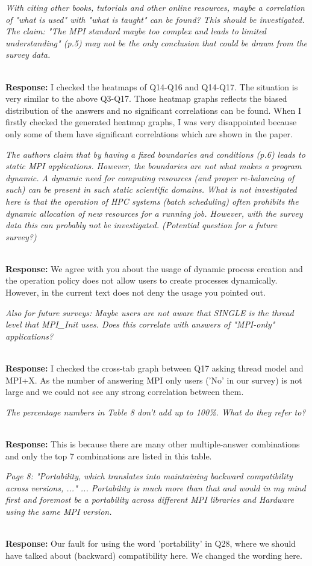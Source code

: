 \documentclass[11pt]{article}
\newcommand{\iresponse}[2]{{\item \em #1}\\%
  {\bf Response:} #2}
\begin{document}
\begin{enumerate}
\iresponse{With citing other books, tutorials and other online
  resources, maybe a correlation of "what is used" with "what is
  taught" can be found? This should be investigated. The claim: "The
  MPI standard maybe too complex and leads to limited understanding"
  (p.5) may not be the only conclusion that could be drawn from the
  survey data.}
{I checked the heatmaps of Q14-Q16 and Q14-Q17. The situation is very
  similar to the above Q3-Q17. Those heatmap graphs reflects the
  biased distribution of the answers and no significant correlations
  can be found. When I firstly checked the generated heatmap graphs, I
  was very disappointed because only some of them have significant
  correlations which are shown in the paper.}

\iresponse{The authors claim that by having a fixed boundaries and
  conditions (p.6) leads to static MPI applications. However, the
  boundaries are not what makes a program dynamic. A dynamic need for
  computing resources (and proper re-balancing of such) can be present
  in such static scientific domains. What is not investigated here is
  that the operation of HPC systems (batch scheduling) often prohibits
  the dynamic allocation of new resources for a running job. However,
  with the survey data this can probably not be
  investigated. (Potential question for a future survey?)}
{We agree with you about the usage of dynamic process creation and the
  operation policy does not allow users to create processes dynamically.
  However, in the current text does not deny the usage you pointed
  out.}

\iresponse{Also for future surveys: Maybe users are not aware that
  SINGLE is the thread level that MPI\_Init uses. Does this correlate
  with answers of "MPI-only" applications?}
{I checked the cross-tab graph between Q17 asking thread model and
  MPI+X. As the number of answering MPI only users ('No' in our
  survey) is not large and we could not see any strong correlation
  between them. }

\iresponse{The percentage numbers in Table 8 don't add up to
  100\%. What do they refer to?}
{This is because there are many other multiple-answer combinations and
only the top 7 combinations are listed in this table.}

\iresponse{Page 8: "Portability, which translates into maintaining
  backward compatibility across versions, ..." ... Portability is much
  more than that and would in my mind first and foremost be a
  portability across different MPI libraries and Hardware using the
  same MPI version.}
{Our fault for using the word
  'portability' in Q28, where we should have talked about (backward) compatibility
here. We changed the wording here.}


\end{enumerate}
\end{document}

